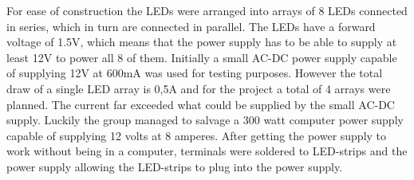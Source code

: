 For ease of construction the LEDs were arranged into arrays of 8 LEDs connected in series, which in turn are connected in parallel. The LEDs have a forward voltage of 1.5V, which means that the power supply has to be able to supply at least 12V to power all 8 of them. Initially a small AC-DC power supply capable of supplying 12V at 600mA was used for testing purposes. However the total draw of a single LED array is 0,5A and for the project a total of 4 arrays were planned. The current far exceeded what could be supplied by the small AC-DC supply. Luckily the group managed to salvage a 300 watt computer power supply capable of supplying 12 volts at 8 amperes. After getting the power supply to work without being in a computer, terminals were soldered to LED-strips and the power supply allowing the LED-strips to plug into the power supply.

